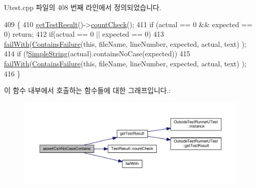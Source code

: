 Utest.\+cpp 파일의 408 번째 라인에서 정의되었습니다.


\begin{DoxyCode}
409 \{
410     \hyperlink{class_utest_shell_a34c525b685e30431750d9e355fdfff0c}{getTestResult}()->\hyperlink{class_test_result_a58577489a2418efb4c440761e533f2e7}{countCheck}();
411     \textcolor{keywordflow}{if} (actual == 0 && expected == 0) \textcolor{keywordflow}{return};
412     \textcolor{keywordflow}{if}(actual == 0 || expected == 0)
413         \hyperlink{class_utest_shell_ad50ae28f5ad9f1d224832cb1f89365a7}{failWith}(\hyperlink{class_contains_failure}{ContainsFailure}(\textcolor{keyword}{this}, fileName, lineNumber, expected, actual, text)
      );
414     \textcolor{keywordflow}{if} (!\hyperlink{class_simple_string}{SimpleString}(actual).containsNoCase(expected))
415         \hyperlink{class_utest_shell_ad50ae28f5ad9f1d224832cb1f89365a7}{failWith}(\hyperlink{class_contains_failure}{ContainsFailure}(\textcolor{keyword}{this}, fileName, lineNumber, expected, actual, text)
      );
416 \}
\end{DoxyCode}


이 함수 내부에서 호출하는 함수들에 대한 그래프입니다.\+:
\nopagebreak
\begin{figure}[H]
\begin{center}
\leavevmode
\includegraphics[width=350pt]{class_utest_shell_afca15ab751bda33d3784efe4b06bf875_cgraph}
\end{center}
\end{figure}


